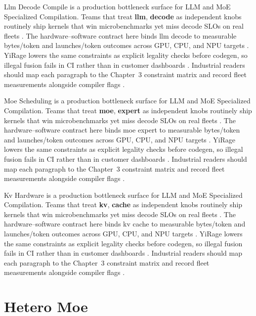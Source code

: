 Llm Decode Compile is a production bottleneck surface for LLM and MoE Specialized Compilation. Teams that treat \textbf{llm}, \textbf{decode} as independent knobs routinely ship kernels that win microbenchmarks yet miss decode SLOs on real fleets \citep{patel2025llminference,nvidia2022hopper}. The hardware--software contract here binds llm decode to measurable bytes/token and launches/token outcomes across GPU, CPU, and NPU targets \citep{taxbreak2026,semianalysis2024tma}. YiRage lowers the same constraints as explicit legality checks before codegen, so illegal fusion fails in CI rather than in customer dashboards \citep{memoryfloor2026,amd2024xdna}. Industrial readers should map each paragraph to the Chapter~3 constraint matrix and record fleet measurements alongside compiler flags \citep{nvidia2022hopper,amd2024aie}.

Moe Scheduling is a production bottleneck surface for LLM and MoE Specialized Compilation. Teams that treat \textbf{moe}, \textbf{expert} as independent knobs routinely ship kernels that win microbenchmarks yet miss decode SLOs on real fleets \citep{taxbreak2026,semianalysis2024tma}. The hardware--software contract here binds moe expert to measurable bytes/token and launches/token outcomes across GPU, CPU, and NPU targets \citep{memoryfloor2026,amd2024xdna}. YiRage lowers the same constraints as explicit legality checks before codegen, so illegal fusion fails in CI rather than in customer dashboards \citep{nvidia2022hopper,amd2024aie}. Industrial readers should map each paragraph to the Chapter~3 constraint matrix and record fleet measurements alongside compiler flags \citep{semianalysis2024tma,dlbook}.

Kv Hardware is a production bottleneck surface for LLM and MoE Specialized Compilation. Teams that treat \textbf{kv}, \textbf{cache} as independent knobs routinely ship kernels that win microbenchmarks yet miss decode SLOs on real fleets \citep{memoryfloor2026,amd2024xdna}. The hardware--software contract here binds kv cache to measurable bytes/token and launches/token outcomes across GPU, CPU, and NPU targets \citep{nvidia2022hopper,amd2024aie}. YiRage lowers the same constraints as explicit legality checks before codegen, so illegal fusion fails in CI rather than in customer dashboards \citep{semianalysis2024tma,dlbook}. Industrial readers should map each paragraph to the Chapter~3 constraint matrix and record fleet measurements alongside compiler flags \citep{amd2024xdna,dao2022flashattention}.

\section{Hetero Moe}
\label{sec:hetero_moe}

